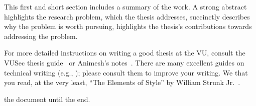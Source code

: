 This first and short section includes a summary of the work.
%
A strong abstract highlights the research problem, which the thesis addresses,
succinctly describes why the problem is worth pursuing, highlights the thesis's
contributions towards addressing the problem.


For more detailed instructions on writing a good thesis at the VU, consult the
VUSec thesis guide~\cite{VUSec-WebArticle2022} or Animesh's
notes~\cite{Trivedi-WebArticle2021}.
%
There are many excellent guides on technical writing (e.g., \cite{Jones-Talk2015, Heiser-Talk2018});
please consult them to improve your writing.
%
We  that you read, at the very least, “The Elements
of Style” by William Strunk Jr.~\cite{William-Strunk-Jr.-Book1918}.


the document until the end.


